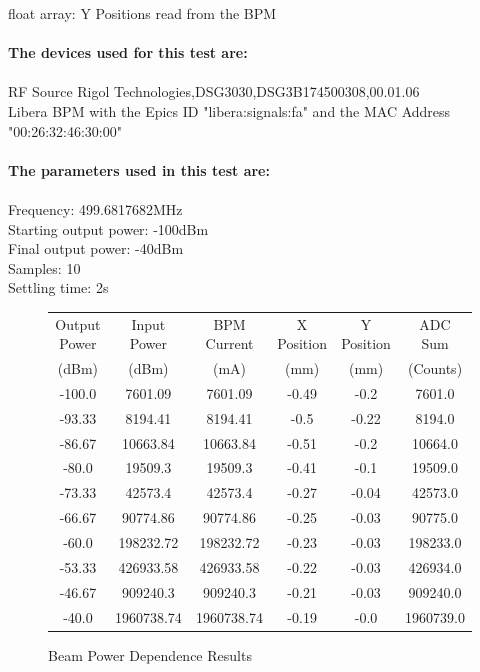 \documentclass[a4paper, 11pt]{article}%
\begin{document}
        float array: Y Positions read from the BPM\\~\\
\textbf{The devices used for this test are:}\\\\%
RF Source Rigol Technologies,DSG3030,DSG3B174500308,00.01.06\\%
Libera BPM with the Epics ID "libera:signals:fa" and the MAC Address "00:26:32:46:30:00"\\%
\\%
\textbf{The parameters used in this test are:}\\\\%
Frequency: 499.6817682MHz\\%
Starting output power: -100dBm\\%
Final output power: -40dBm\\%
Samples: 10\\%
Settling time: 2s\\

%
\begin{figure}[htbp]%
\centering%
\caption{Beam Power Dependence Results}%
\begin{tabular}{|c|c|c|c|c|c|}%
\hline%
Output Power&Input Power&BPM Current&X Position&Y Position&ADC Sum\\%
(dBm)&(dBm)&(mA)&(mm)&(mm)&(Counts)\\%
\hline%
{-}100.0&7601.09&7601.09&{-}0.49&{-}0.2&7601.0\\%
{-}93.33&8194.41&8194.41&{-}0.5&{-}0.22&8194.0\\%
{-}86.67&10663.84&10663.84&{-}0.51&{-}0.2&10664.0\\%
{-}80.0&19509.3&19509.3&{-}0.41&{-}0.1&19509.0\\%
{-}73.33&42573.4&42573.4&{-}0.27&{-}0.04&42573.0\\%
{-}66.67&90774.86&90774.86&{-}0.25&{-}0.03&90775.0\\%
{-}60.0&198232.72&198232.72&{-}0.23&{-}0.03&198233.0\\%
{-}53.33&426933.58&426933.58&{-}0.22&{-}0.03&426934.0\\%
{-}46.67&909240.3&909240.3&{-}0.21&{-}0.03&909240.0\\%
{-}40.0&1960738.74&1960738.74&{-}0.19&{-}0.0&1960739.0\\%
\hline%
\end{tabular}%
\end{figure}%
\end{document}
